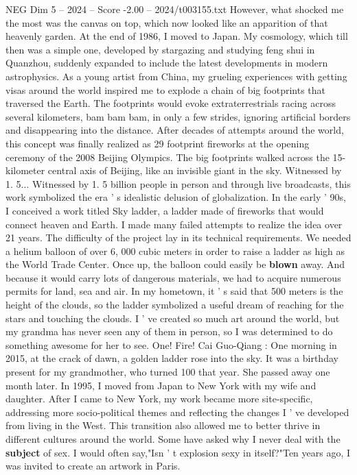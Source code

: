 \begin{textsample}{NEG Dim 5 – 2024 – Score -2.00 – 2024/t003155.txt}
However, what shocked me the most was the canvas on top, which now looked like an apparition of that heavenly garden.
At the end of 1986, I moved to Japan.
My cosmology, which till then was a simple one, developed by stargazing and studying feng shui in Quanzhou, suddenly expanded to include the latest developments in modern astrophysics.
As a young artist from China, my grueling experiences with getting visas around the world inspired me to explode a chain of big footprints that traversed the Earth.
The footprints would evoke extraterrestrials racing across several kilometers, bam bam bam, in only a few strides, ignoring artificial borders and disappearing into the distance.
After decades of attempts around the world, this concept was finally realized as 29 footprint fireworks at the opening ceremony of the 2008 Beijing Olympics.
The big footprints walked across the 15-kilometer central axis of Beijing, like an invisible giant in the sky.
Witnessed by 1. 5...
Witnessed by 1. 5 billion people in person and through live broadcasts, this work symbolized the era ' s idealistic delusion of globalization.
In the early ' 90s, I conceived a work titled Sky ladder, a ladder made of fireworks that would connect heaven and Earth.
I made many failed attempts to realize the idea over 21 years.
The difficulty of the project lay in its technical requirements.
We needed a helium balloon of over 6, 000 cubic meters in order to raise a ladder as high as the World Trade Center.
Once up, the balloon could easily be \textbf{blown} away.
And because it would carry lots of dangerous materials, we had to acquire numerous permits for land, sea and air.
In my hometown, it ' s said that 500 meters is the height of the clouds, so the ladder symbolized a useful dream of reaching for the stars and touching the clouds.
I ' ve created so much art around the world, but my grandma has never seen any of them in person, so I was determined to do something awesome for her to see.
One!
Fire!
Cai Guo-Qiang : One morning in 2015, at the crack of dawn, a golden ladder rose into the sky.
It was a birthday present for my grandmother, who turned 100 that year.
She passed away one month later.
In 1995, I moved from Japan to New York with my wife and daughter.
After I came to New York, my work became more site-specific, addressing more socio-political themes and reflecting the changes I ' ve developed from living in the West.
This transition also allowed me to better thrive in different cultures around the world.
Some have asked why I never deal with the \textbf{subject} of sex.
I would often say,"Isn ' t explosion sexy in itself?"Ten years ago, I was invited to create an artwork in Paris.

\end{textsample}
